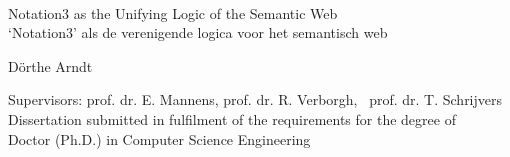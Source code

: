 
{\large \ \vspace{0.25\textheight} \\

\hspace{-\parindent}Notation3 as the Unifying Logic of the Semantic Web\\

\hspace{-\parindent}`Notation3' als de verenigende logica voor het semantisch web


\vspace{0.5cm}
\hspace{-\parindent}D\"orthe Arndt

}

\vspace*{\fill}
\hspace{-\parindent}Supervisors: prof. dr. E. Mannens, prof. dr. R. Verborgh,~ prof. dr. T. Schrijvers\\
\hspace{-\parindent}Dissertation submitted in fulfilment of the requirements for the degree of\\
\hspace{-\parindent}Doctor (Ph.D.) in Computer Science Engineering\\


\vspace{0.5cm}


